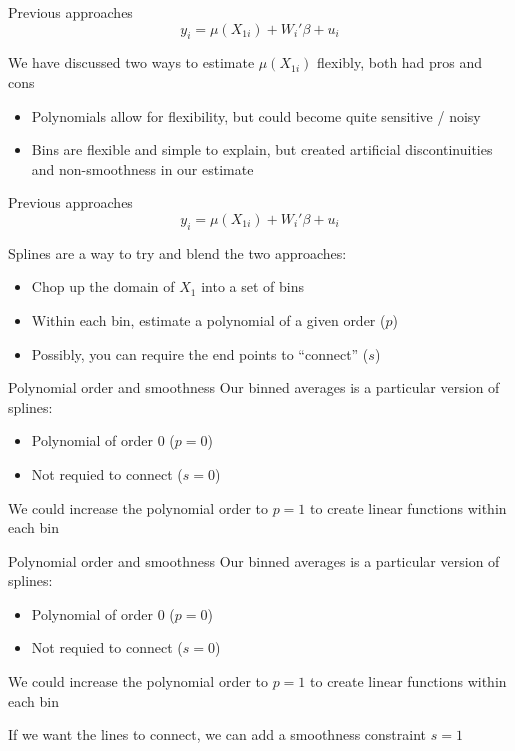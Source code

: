 \documentclass[aspectratio=169,t,11pt,table]{beamer}
\begin{document}
\begin{frame}{Previous approaches}
  \vspace*{-\bigskipamount}
  $$
    y_i = \mu(X_{1i}) + W_i' \beta + u_i
  $$

  We have discussed two ways to estimate $\mu(X_{1i})$ flexibly, both had pros and cons
  \begin{itemize}
    \item Polynomials allow for flexibility, but could become quite sensitive / noisy
    
    \item Bins are flexible and simple to explain, but created artificial discontinuities and non-smoothness in our estimate
  \end{itemize}
\end{frame}

\begin{frame}{Previous approaches}
  \vspace*{-\bigskipamount}
  $$
    y_i = \mu(X_{1i}) + W_i' \beta + u_i
  $$

  \bigskip
  \alert{Splines} are a way to try and blend the two approaches:
  \begin{itemize}
    \item Chop up the domain of $X_1$ into a set of bins
    
    \item Within each bin, estimate a polynomial of a given order ($p$)
    
    \item Possibly, you can require the end points to ``connect'' ($s$)
  \end{itemize}
\end{frame}

\begin{frame}{Polynomial order and smoothness}
  Our binned averages is a particular version of splines:
  \begin{itemize}
    \item Polynomial of order 0 ($p = 0$)
    \item Not requied to connect ($s = 0$)
  \end{itemize}

  \bigskip
  We could increase the polynomial order to $p = 1$ to create linear functions within each bin
\end{frame}


\begin{frame}{Polynomial order and smoothness}
  Our binned averages is a particular version of splines:
  \begin{itemize}
    \item Polynomial of order 0 ($p = 0$)
    \item Not requied to connect ($s = 0$)
  \end{itemize}

  \bigskip
  We could increase the polynomial order to $p = 1$ to create linear functions within each bin

  \bigskip
  If we want the lines to connect, we can add a smoothness constraint $s = 1$
\end{frame}
\end{document}
